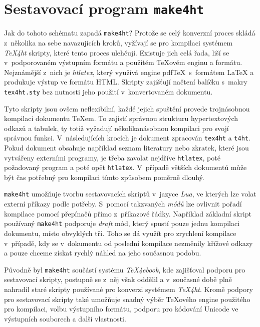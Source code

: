 \documentclass{csbulletin}
\newcommand\nazev[1]{\textit{#1}}
\newcommand\prikaz[1]{\texttt{#1}}
\begin{document}
\section{Sestavovací program \prikaz{make4ht}}

Jak do tohoto schématu zapadá \prikaz{make4ht}? Protože se celý konverzní proces
skládá z~několika na sebe navazujících kroků, vyžívají se pro kompilaci
systémem \nazev{TeX4ht} skripty, které tento proces ulehčují. Existuje jich
celá řada, liší se v~podporovaném výstupním formátu a použitém \TeX ovém enginu
a formátu. Nejznámější z~nich je \nazev{htlatex}, který využívá engine pdf\TeX\
s~formátem \LaTeX{} a produkuje výstup ve formátu HTML. Skripty zajišťují načtení
balíčku s~makry \prikaz{tex4ht.sty} bez nutnosti jeho použití
v~konvertovaném dokumentu.

Tyto skripty jsou ovšem neflexibilní, každé jejich spuštění provede
trojnásobnou kompilaci dokumentu \TeX em. To zajistí správnou strukturu
hypertextových odkazů a tabulek, ty totiž vyžadují několikanásobnou kompilaci
pro svojí správnou funkci. V~následujících krocích je dokument zpracován
\prikaz{tex4ht} a \prikaz{t4ht}. Pokud dokument obsahuje například seznam
literatury nebo zkratek, které jsou vytvářeny externími programy, je třeba
zavolat nejdříve \prikaz{htlatex}, poté požadovaný program a poté opět
\prikaz{htlatex}. V~případě větších dokumentů může být čas potřebný pro
kompilaci tímto způsobem poměrně dlouhý.

\prikaz{make4ht} umožňuje tvorbu sestavovacích skriptů v~jazyce \nazev{Lua}, ve
kterých lze volat externí příkazy podle potřeby. S~pomocí takzvaných
\nazev{módů} lze ovlivnit pořadí kompilace pomocí přepínačů přímo z~příkazové
řádky. Například základní skript používaný \prikaz{make4ht} podporuje
\nazev{draft} mód, který spustí pouze jednu kompilaci dokumentu, místo
obvyklých tří. Toho se dá využít pro zrychlení kompilace v~případě, kdy se
v~dokumentu od poslední kompilace nezměnily křížové odkazy a pouze chceme získat
rychlý náhled na jeho současnou podobu.

Původně byl \prikaz{make4ht} součástí systému \nazev{TeX4ebook}, kde zajišťoval
podporu pro sestavovací skripty, postupně se z~něj však oddělil a v~současné
době plně nahradil staré skripty používané pro konverzi systémem \nazev{TeX4ht}. 
Kromě podpory pro sestavovací skripty také umožňuje snadný výběr \TeX ového
engine použitého pro kompilaci, volbu výstupního formátu, podporu pro kódování
Unicode ve výstupních souborech a další vlastnosti.
\end{document}

